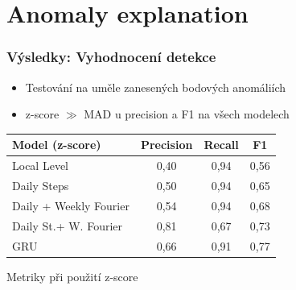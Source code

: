 \documentclass[czech,blue]{ctufit-presentation}
\begin{document}
\section{Anomaly explanation}
\begin{frame}
	\frametitle{Výsledky: Vyhodnocení detekce}
	\begin{itemize}
		\item Testování na uměle zanesených bodových anomáliích
		\item z-score $\gg$ MAD u precision a F1 na všech modelech
	\end{itemize}
	\vspace{0.5em}
	\centering
	\begin{tabular}{lccc}
		\toprule
		Model (z-score) & Precision & Recall & F1 \\
		\midrule
		Local Level             & 0,40 & 0,94 & 0,56 \\
		Daily Steps             & 0,50 & 0,94 & 0,65 \\
		Daily + Weekly Fourier  & 0,54 & 0,94 & 0,68 \\
		Daily St.+ W. Fourier   & 0,81 & 0,67 & 0,73 \\
		GRU & 0,66 & 0,91 & 0,77 \\
		\bottomrule
	\end{tabular}
	\vspace{0.2em}
	{\scriptsize Metriky při použití z-score}
	\vspace{0.4em}
\end{frame}



\end{document}
